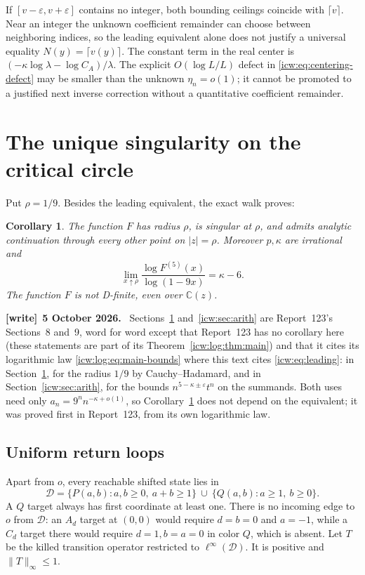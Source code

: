 \documentclass[11pt,letterpaper]{article}
\newtheorem{corollary}[theorem]{Corollary}
\theoremstyle{remark}\newtheorem{remark}[theorem]{Remark}
\newcommand{\CC}{\mathbb C}
\newcommand{\eps}{\varepsilon}
\newcommand{\1}{\mathbf1}
\newenvironment{writenote}[1][]{\par\smallskip\begingroup\small
 \noindent\textbf{[write]}\if\relax\detokenize{#1}\relax\else~\textbf{#1.}\fi\ }%
 {\par\endgroup\smallskip}
\begin{document}
If $[v-\eps,v+\eps]$ contains no integer, both bounding ceilings
coincide with $\lceil v\rceil$. Near an integer the unknown coefficient
remainder can choose between neighboring indices, so the leading
equivalent alone does not justify a universal equality
$N(y)=\lceil v(y)\rceil$. The constant term in the real center is
$(-\kappa\log\lambda-\log C_A)/\lambda$. The explicit
$O(\log L/L)$ defect in \eqref{icw:eq:centering-defect} may be smaller
than the unknown $\eta_n=o(1)$; it cannot be promoted to a justified
next inverse correction without a quantitative coefficient remainder.

\section{The unique singularity on the critical circle}\label{icw:sec:circle}
Put $\rho=1/9$. Besides the leading equivalent, the exact walk proves:
\begin{corollary}\label{icw:cor:analytic}
The function $F$ has radius $\rho$, is singular at $\rho$, and admits
analytic continuation through every other point on $|z|=\rho$.
Moreover $p,\kappa$ are irrational and
\begin{equation}\label{icw:eq:derivative-limit}
 \lim_{x\uparrow\rho}\frac{\log F^{(5)}(x)}{\log(1-9x)}=\kappa-6.
\end{equation}
The function $F$ is not D-finite, even over $\CC(z)$.
\end{corollary}
\begin{writenote}[5 October 2026]
Sections~\ref{icw:sec:circle} and~\ref{icw:sec:arith} are Report~123's Sections~8 and~9, word for word except that Report~123 has no corollary here (these statements are part of its Theorem~\ref{icw:log:thm:main}) and that it cites its logarithmic law \eqref{icw:log:eq:main-bounds} where this text cites \eqref{icw:eq:leading}: in Section~\ref{icw:sec:circle}, for the radius $1/9$ by Cauchy--Hadamard, and in Section~\ref{icw:sec:arith}, for the bounds $n^{5-\kappa\pm\eps}t^n$ on the summands. Both uses need only $a_n=9^nn^{-\kappa+o(1)}$, so Corollary~\ref{icw:cor:analytic} does not depend on the equivalent; it was proved first in Report~123, from its own logarithmic law.
\end{writenote}
\subsection{Uniform return loops}
Apart from $o$, every reachable shifted state lies in
\[
 \mathcal D=\{P(a,b):a,b\ge0,\ a+b\ge1\}
       \ \cup\ \{Q(a,b):a\ge1,\ b\ge0\}.
\]
A $Q$ target always has first coordinate at least one. There is no incoming
edge to $o$ from $\mathcal D$: an $A_d$ target at $(0,0)$ would require
$d=b=0$ and $a=-1$, while a $C_d$ target there would require
$d=1,b=a=0$ in color $Q$, which is absent. Let $T$ be the killed
transition operator restricted to $\ell^\infty(\mathcal D)$. It is
positive and $\|T\|_\infty\le1$.
\end{document}
